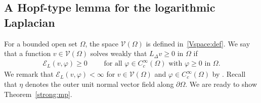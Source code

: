 \documentclass[11pt]{article}
\numberwithin{equation}{section}
\newcommand{\cE}{{\mathcal E}}
\begin{document}
\subsection{A Hopf-type lemma for the logarithmic Laplacian}

For a bounded open set $\Omega$, the space ${\mathcal V}(\Omega)$ is defined in~\eqref{Vspace:def}.  We say that a function $v\in {\mathcal V}(\Omega)$ solves weakly that $L_\Delta v\geq 0$ in $\Omega$ if
\begin{align*}
\cE_L(v, \varphi) \geq 0\qquad \text{ for all $\varphi \in C^\infty_c(\Omega)$ with $\varphi \geq 0$ in $\Omega$}.
\end{align*}
We remark that $\cE_L(v, \varphi)<\infty$ for $v\in {\mathcal V}(\Omega)$ and $\varphi \in C^\infty_c(\Omega)$  by \cite[Lemma 4.4]{CW19}.  Recall that $\eta$ denotes the outer unit normal vector field along $\partial \Omega$. We are ready to show Theorem~\ref{strong:mp}.
\end{document}
